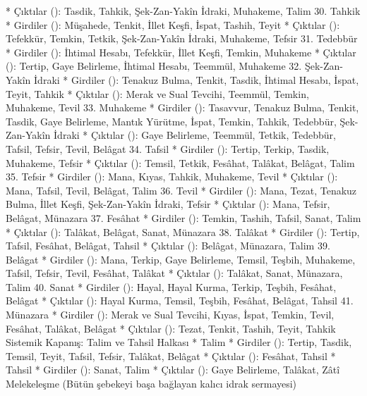 \documentclass[11pt,a4paper]{article}
\begin{document}
 * Çıktılar (\rightarrow): Tasdik, Tahkik, Şek-Zan-Yakîn İdraki, Muhakeme, Talim
30. Tahkik
 * Girdiler (\leftarrow): Müşahede, Tenkit, İllet Keşfi, İspat, Tashih, Teyit
 * Çıktılar (\rightarrow): Tefekkür, Temkin, Tetkik, Şek-Zan-Yakîn İdraki, Muhakeme, Tefsir
31. Tedebbür
 * Girdiler (\leftarrow): İhtimal Hesabı, Tefekkür, İllet Keşfi, Temkin, Muhakeme
 * Çıktılar (\rightarrow): Tertip, Gaye Belirleme, İhtimal Hesabı, Teemmül, Muhakeme
32. Şek-Zan-Yakîn İdraki
 * Girdiler (\leftarrow): Tenakuz Bulma, Tenkit, Tasdik, İhtimal Hesabı, İspat, Teyit, Tahkik
 * Çıktılar (\rightarrow): Merak ve Sual Tevcihi, Teemmül, Temkin, Muhakeme, Tevil
33. Muhakeme
 * Girdiler (\leftarrow): Tasavvur, Tenakuz Bulma, Tenkit, Tasdik, Gaye Belirleme, Mantık Yürütme, İspat, Temkin, Tahkik, Tedebbür, Şek-Zan-Yakîn İdraki
 * Çıktılar (\rightarrow): Gaye Belirleme, Teemmül, Tetkik, Tedebbür, Tafsil, Tefsir, Tevil, Belâgat
34. Tafsil
 * Girdiler (\leftarrow): Tertip, Terkip, Tasdik, Muhakeme, Tefsir
 * Çıktılar (\rightarrow): Temsil, Tetkik, Fesâhat, Talâkat, Belâgat, Talim
35. Tefsir
 * Girdiler (\leftarrow): Mana, Kıyas, Tahkik, Muhakeme, Tevil
 * Çıktılar (\rightarrow): Mana, Tafsil, Tevil, Belâgat, Talim
36. Tevil
 * Girdiler (\leftarrow): Mana, Tezat, Tenakuz Bulma, İllet Keşfi, Şek-Zan-Yakîn İdraki, Tefsir
 * Çıktılar (\rightarrow): Mana, Tefsir, Belâgat, Münazara
37. Fesâhat
 * Girdiler (\leftarrow): Temkin, Tashih, Tafsil, Sanat, Talim
 * Çıktılar (\rightarrow): Talâkat, Belâgat, Sanat, Münazara
38. Talâkat
 * Girdiler (\leftarrow): Tertip, Tafsil, Fesâhat, Belâgat, Tahsil
 * Çıktılar (\rightarrow): Belâgat, Münazara, Talim
39. Belâgat
 * Girdiler (\leftarrow): Mana, Terkip, Gaye Belirleme, Temsil, Teşbih, Muhakeme, Tafsil, Tefsir, Tevil, Fesâhat, Talâkat
 * Çıktılar (\rightarrow): Talâkat, Sanat, Münazara, Talim
40. Sanat
 * Girdiler (\leftarrow): Hayal, Hayal Kurma, Terkip, Teşbih, Fesâhat, Belâgat
 * Çıktılar (\rightarrow): Hayal Kurma, Temsil, Teşbih, Fesâhat, Belâgat, Tahsil
41. Münazara
 * Girdiler (\leftarrow): Merak ve Sual Tevcihi, Kıyas, İspat, Temkin, Tevil, Fesâhat, Talâkat, Belâgat
 * Çıktılar (\rightarrow): Tezat, Tenkit, Tashih, Teyit, Tahkik
Sistemik Kapanış: Talim ve Tahsil Halkası
 * Talim
   * Girdiler (\leftarrow): Tertip, Tasdik, Temsil, Teyit, Tafsil, Tefsir, Talâkat, Belâgat
   * Çıktılar (\rightarrow): Fesâhat, Tahsil
 * Tahsil
   * Girdiler (\leftarrow): Sanat, Talim
   * Çıktılar (\rightarrow): Gaye Belirleme, Talâkat, Zâtî Melekeleşme (Bütün şebekeyi başa bağlayan kalıcı idrak sermayesi)
\end{document}
